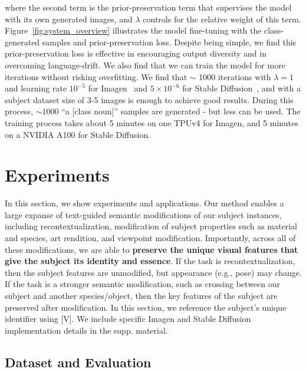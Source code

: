 where the second term is the prior-preservation term that supervises the model with its own generated images, and $\lambda$ controls for the relative weight of this term. Figure~\ref{fig:system_overview} illustrates the model fine-tuning with the class-generated samples and prior-preservation loss. Despite being simple, we find this prior-preservation loss is effective in encouraging output diversity and  in overcoming language-drift. We also find that we can train the model for more iterations without risking overfitting. We find that \(\sim \) 1000 iterations with $\lambda = 1$ and learning rate $10^{-5}$ for Imagen~\cite{saharia2022photorealistic} and $5 \times 10^{-6}$ for Stable Diffusion~\cite{rombach2022high}, and with a subject dataset size of 3-5 images is enough to achieve good results. During this process, $\sim 1000$ ``a [class noun]'' samples are generated - but less can be used. The training process takes about 5 minutes on one TPUv4 for Imagen, and 5 minutes on a NVIDIA A100 for Stable Diffusion.

\section{Experiments} 
\label{sec:app}

In this section, we show experiments and applications. Our method enables a large expanse of text-guided semantic modifications of our subject instances, including recontextualization, modification of subject properties such as material and species, art rendition, and viewpoint modification. Importantly, across all of these modifications, we are able to \textbf{preserve the unique visual features that give the subject its identity and essence}. If the task is recontextualization, then the subject features are unmodified, but appearance (e.g., pose) may change. If the task is a stronger semantic modification, such as crossing between our subject and another species/object, then the key features of the subject are preserved after modification. In this section, we reference the subject's unique identifier using [V]. We include specific Imagen and Stable Diffusion implementation details in the supp. material.

\subsection{Dataset and Evaluation}

